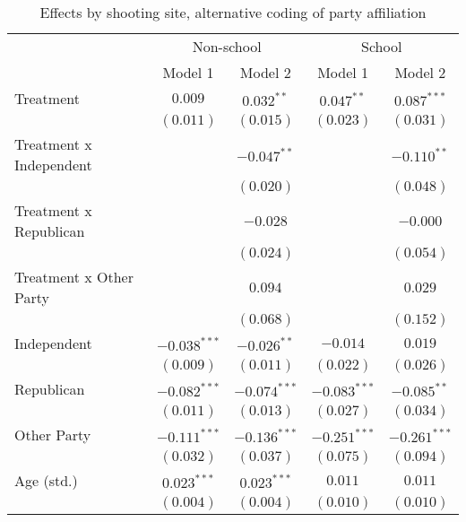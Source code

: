 
\begin{table}
\caption{Effects by shooting site, alternative coding of party affiliation}
\begin{center}
\begin{tabular}{l c c c c}
\toprule
 & \multicolumn{2}{c}{Non-school} & \multicolumn{2}{c}{School} \\
\cmidrule(lr){2-3} \cmidrule(lr){4-5}
 & Model 1 & Model 2 & Model 1 & Model 2 \\
\midrule
Treatment               & $0.009$        & $0.032^{**}$   & $0.047^{**}$   & $0.087^{***}$  \\
                        & $(0.011)$      & $(0.015)$      & $(0.023)$      & $(0.031)$      \\
Treatment x Independent &                & $-0.047^{**}$  &                & $-0.110^{**}$  \\
                        &                & $(0.020)$      &                & $(0.048)$      \\
Treatment x Republican  &                & $-0.028$       &                & $-0.000$       \\
                        &                & $(0.024)$      &                & $(0.054)$      \\
Treatment x Other Party &                & $0.094$        &                & $0.029$        \\
                        &                & $(0.068)$      &                & $(0.152)$      \\
Independent             & $-0.038^{***}$ & $-0.026^{**}$  & $-0.014$       & $0.019$        \\
                        & $(0.009)$      & $(0.011)$      & $(0.022)$      & $(0.026)$      \\
Republican              & $-0.082^{***}$ & $-0.074^{***}$ & $-0.083^{***}$ & $-0.085^{**}$  \\
                        & $(0.011)$      & $(0.013)$      & $(0.027)$      & $(0.034)$      \\
Other Party             & $-0.111^{***}$ & $-0.136^{***}$ & $-0.251^{***}$ & $-0.261^{***}$ \\
                        & $(0.032)$      & $(0.037)$      & $(0.075)$      & $(0.094)$      \\
Age (std.)              & $0.023^{***}$  & $0.023^{***}$  & $0.011$        & $0.011$        \\
                        & $(0.004)$      & $(0.004)$      & $(0.010)$      & $(0.010)$      \\

\end{tabular}
\end{center}
\end{table}
